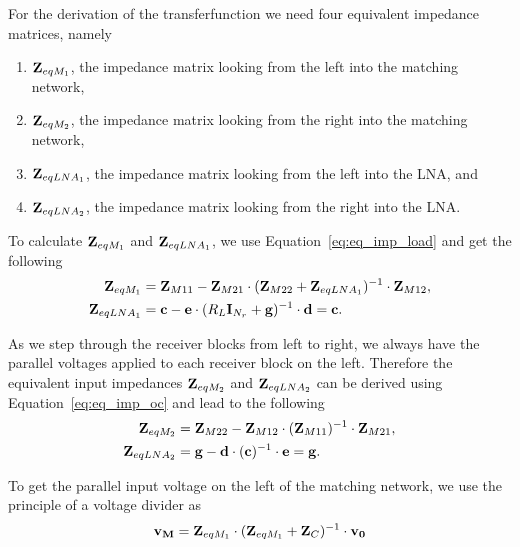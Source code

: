 For the derivation of the transferfunction we need four equivalent impedance matrices, namely
\begin{enumerate}
\item{$\mathbf{Z}_{eqM_1}$, the impedance matrix looking from the left into the matching network,}
\item{$\mathbf{Z}_{eqM_2}$, the impedance matrix looking from the right into the matching network,}
\item{$\mathbf{Z}_{eqLNA_1}$, the impedance matrix looking from the left into the LNA, and}
\item{$\mathbf{Z}_{eqLNA_2}$, the impedance matrix looking from the right into the LNA.}
\end{enumerate}

To calculate $\mathbf{Z}_{eqM_1}$ and $\mathbf{Z}_{eqLNA_1}$, we use Equation~\eqref{eq:eq_imp_load} and get the following
\begin{align}
\label{eq:zeqm1}
\mathbf{Z}_{eqM_1} &= \mathbf{Z}_{M11} - \mathbf{Z}_{M21}\cdot(\mathbf{Z}_{M22} + \mathbf{Z}_{eqLNA_1})^{-1}\cdot\mathbf{Z}_{M12},\\
\label{eq:zeqlna1}
\mathbf{Z}_{eqLNA_1} &= \mathbf{c} - \mathbf{e}\cdot(R_L\mathbf{I}_{N_r} + \mathbf{g})^{-1}\cdot\mathbf{d} = \mathbf{c}.
\end{align}

As we step through the receiver blocks from left to right, we always have the parallel voltages applied to each receiver block on the left.
Therefore the equivalent input impedances $\mathbf{Z}_{eqM_2}$ and $\mathbf{Z}_{eqLNA_2}$ can be derived using Equation~\eqref{eq:eq_imp_oc} and lead to the following
\begin{align}
\label{eq:zeqm2}
\mathbf{Z}_{eqM_2} &= \mathbf{Z}_{M22} - \mathbf{Z}_{M12}\cdot(\mathbf{Z}_{M11})^{-1}\cdot\mathbf{Z}_{M21},\\
\label{eq:zeqlna2}
\mathbf{Z}_{eqLNA_2} &= \mathbf{g} - \mathbf{d}\cdot(\mathbf{c})^{-1}\cdot\mathbf{e} = \mathbf{g}.
\end{align}

To get the parallel input voltage on the left of the matching network, we use the principle of a voltage divider as
\begin{equation}
\mathbf{v_M} = \mathbf{Z}_{eqM_1}\cdot(\mathbf{Z}_{eqM_1} + \mathbf{Z}_{C})^{-1} \cdot \mathbf{v_0}
\end{equation}


